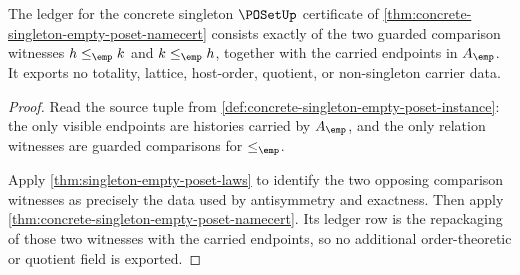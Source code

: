 \begin{theorem}
\label{thm:poset-ledger-obligation}
The ledger for the concrete singleton $\POSetUp$ certificate of
\autoref{thm:concrete-singleton-empty-poset-namecert} consists exactly of the
two guarded comparison witnesses $h\le_{\emp}k$ and $k\le_{\emp}h$, together
with the carried endpoints in $A_{\emp}$. It exports no totality, lattice,
host-order, quotient, or non-singleton carrier data.
\end{theorem}
\begin{proof}
Read the source tuple from
\autoref{def:concrete-singleton-empty-poset-instance}: the only visible
endpoints are histories carried by $A_{\emp}$, and the only relation witnesses
are guarded comparisons for $\le_{\emp}$.

Apply \autoref{thm:singleton-empty-poset-laws} to identify the two opposing
comparison witnesses as precisely the data used by antisymmetry and exactness.
Then apply \autoref{thm:concrete-singleton-empty-poset-namecert}. Its ledger
row is the repackaging of those two witnesses with the carried endpoints, so
no additional order-theoretic or quotient field is exported.
\end{proof}

